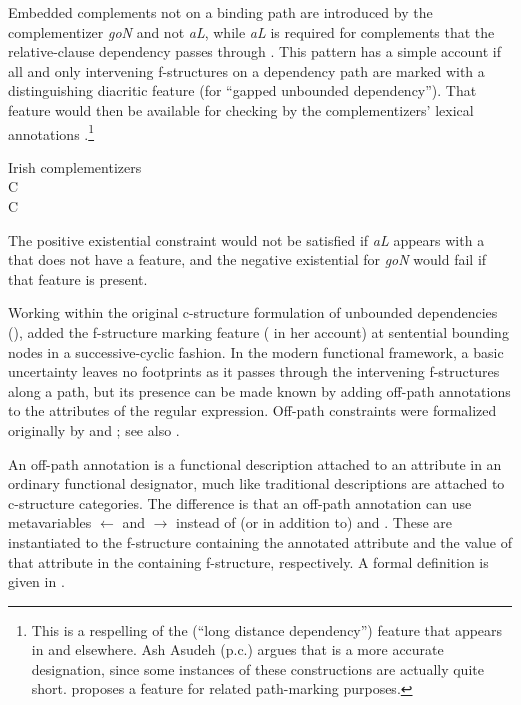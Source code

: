 \documentclass[output=paper,hidelinks]{langscibook}
\begin{document}
\noindent Embedded complements not on a binding path  are introduced by the complementizer \textit{goN} and not \textit{aL}, while \textit{aL} is required for complements that the rel\-a\-tive-clause dependency passes through .  This pattern has a simple account if all and only intervening f-structures on a dependency path are marked with a distinguishing diacritic feature  (for ``gapped unbounded dependency'').  That feature would then be available for checking by the complementizers' lexical annotations .\footnote{This is a respelling of the  (``long distance dependency'') feature that appears in \citet{DLM:LFG} and elsewhere.  Ash Asudeh (p.c.) argues that  is a more accurate designation, since some instances of these constructions are actually quite short. \citet{falk09} proposes a feature  for related path-marking purposes.}

\ea\label{Irishlex}{Irish complementizers}\\
   C{\phantom{$\lnot$}\ugf{\ubd}}\\
   C{\negexist{\ugf{\ubd}}}
\z

\noindent The positive existential constraint would not be satisfied if \textit{aL} appears with a \COMP that does not have a \ubd feature, and the negative existential for \textit{goN} would fail if that feature is present. 

Working within the original \citet{kaplanbresnan82} c-structure formulation of unbounded dependencies (), \citet{zaenen1983} added the f-structure marking feature ( in her account) at sentential bounding nodes in a successive-cyclic fashion.    In the modern functional framework, a basic uncertainty leaves no footprints as it passes through the intervening f-structures along a path, but its presence can be made known by adding off-path annotations to the attributes of the regular expression.   Off-path constraints were formalized originally by \citet{kaplanmaxwell96} and \citet{xledoc}; see also \citet{DLM:LFG}.

An off-path annotation is a functional description attached to an attribute in an ordinary functional designator, much like traditional descriptions are attached to c-structure categories.  The difference is that an off-path annotation can use metavariables $\leftarrow$ and $\rightarrow$ instead of (or in addition to) \UP and \DOWN.  These are instantiated to the f-structure containing the annotated attribute and the value of that attribute in the containing f-structure, respectively.  A formal definition is given in . 
\end{document}
